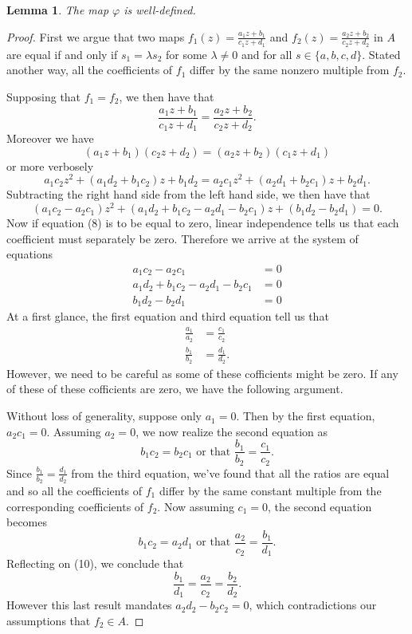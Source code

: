 \documentclass[12pt]{article}
\theoremstyle{plain}
\newtheorem{lemma}[theorem]{Lemma}
\theoremstyle{definition}
\begin{document}
\begin{appendices}
\begin{lemma}
	The map $\varphi$ is well-defined.
\end{lemma}

\begin{proof}
	First we argue that two maps $f_1(z) = \frac{a_1z + b_1}{c_1z + d_1}$ and $f_2(z) = \frac{a_2 z + b_2}{c_2 z + d_2}$ in $A$ are equal if and only if $s_1 = \lambda s_2$ for some $\lambda\neq 0$ and for all $s\in\{a,b,c,d\}$. Stated another way, all the coefficients of $f_1$ differ by the same nonzero multiple from $f_2$.
	
	Supposing that $f_1 = f_2$, we then have that
	\[
		\frac{a_1z + b_1}{c_1z + d_1} = \frac{a_2 z + b_2}{c_2 z + d_2}.
	\]
	Moreover we have
	\[
		(a_1z + b_1)(c_2z + d_2) = (a_2z + b_2)(c_1z + d_1)
	\]
	or more verbosely 
	\[
		 a_1c_2z^2 + (a_1d_2 + b_1c_2)z + b_1d_2 = a_2c_1z^2 + (a_2d_1 + b_2c_1)z + b_2d_1.
	\]
	Subtracting the right hand side from the left hand side, we then have that
	\begin{equation}
		(a_1c_2 - a_2c_1)z^2 + (a_1d_2 + b_1c_2 - a_2d_1 - b_2c_1)z + (b_1d_2 - b_2d_1) = 0.	
	\end{equation}
	Now if equation (8) is to be equal to zero, linear independence tells us that each coefficient must separately be zero. Therefore we arrive at the system of equations
	\begin{align*}
		a_1c_2 - a_2c_1 & = 0\\
		a_1d_2 + b_1c_2 - a_2d_1 - b_2c_1 & = 0\\
		b_1d_2 - b_2d_1 & = 0
	\end{align*}
	At a first glance, the first equation and third equation tell us that 
	\begin{align}
		\frac{a_1}{a_2} & = \frac{c_1}{c_2}\\
		\frac{b_1}{b_2} & = \frac{d_1}{d_2}.
	\end{align} 
	However, we need to be careful as some of these cofficients might be zero. If any of these of these cofficients are zero, we have the following argument. 
	
	Without loss of generality, suppose only $a_1 = 0$. Then by the first equation, $a_2c_1 = 0$. Assuming $a_2 = 0$, we now realize the second equation as 
	\[
		b_1c_2 = b_2c_1 \text{ or that } \frac{b_1}{b_2} = \frac{c_1}{c_2}.
	\]
	Since $\frac{b_1}{b_2} = \frac{d_1}{d_2}$ from the third equation, we've found that all the ratios are equal and so all the coefficients of $f_1$ differ by the same constant multiple from the corresponding coefficients of $f_2$. Now assuming $c_1 = 0$, the second equation becomes
	\[
		b_1c_2 = a_2d_1 \text{ or that } \frac{a_2}{c_2} = \frac{b_1}{d_1}.
	\]
	Reflecting on (10), we conclude that 
	\[
		\frac{b_1}{d_1} = \frac{a_2}{c_2} = \frac{b_2}{d_2}.
	\]
	However this last result mandates $a_2d_2 - b_2c_2 = 0$, which contradictions our assumptions that $f_2\in A$.
	

\end{proof}
\end{appendices}
\end{document}
